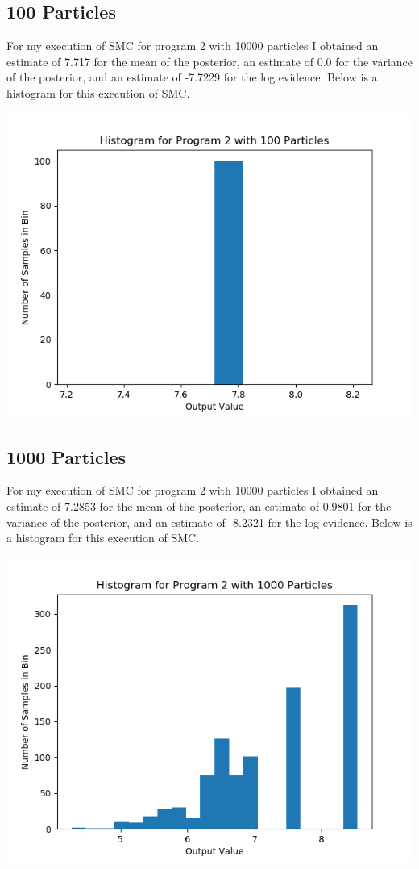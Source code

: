 \documentclass[11pt]{article}
\theoremstyle{definition}
\begin{document}
\subsection{100 Particles}

For my execution of SMC for program 2 with 10000 particles I obtained an estimate of 7.717 for the mean of the posterior, an estimate of 0.0 for the variance of the posterior, and an estimate of -7.7229 for the log evidence. Below is a histogram for this execution of SMC.

\begin{center}
\includegraphics[scale=0.5]{../plots/P2NP100.png}
\end{center}

\subsection{1000 Particles}

For my execution of SMC for program 2 with 10000 particles I obtained an estimate of 7.2853 for the mean of the posterior, an estimate of 0.9801 for the variance of the posterior, and an estimate of -8.2321 for the log evidence. Below is a histogram for this execution of SMC.

\begin{center}
\includegraphics[scale=0.5]{../plots/P2NP1000.png}
\end{center}
\end{document}
